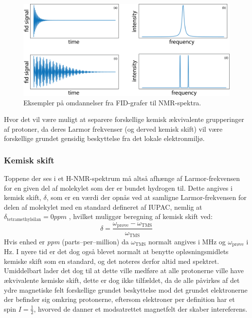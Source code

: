     \begin{figure}[H]
        \includegraphics[width=\textwidth]{billeder/fourier}
        \caption{Eksempler på omdannelser fra FID-grafer til NMR-spektra.}
    \end{figure}
    Hvor det vil være muligt at separere forskellige kemisk ækvivalente grupperinger af protoner, da deres Larmor frekvenser (og derved kemisk skift) vil være forskellige grundet gensidig beskyttelse fra det lokale elektronmiljø.

    \subsubsection{Kemisk skift}
    Toppene der ses i et H-NMR-spektrum må altså afhænge af Larmor-frekvensen for en given del af molekylet som der er bundet hydrogen til. Dette angives i kemisk skift, $\delta$, som er en værdi der opnås ved at samligne Larmor-frekvensen for delen af molekylet med en standard defineret af IUPAC, nemlig at $\delta_{\text{tetramethylsilan}}=0\si{ppm}$ \parencite{Robi2009}, hvilket muliggør beregning af kemisk skift ved:
    \[
        \delta = \frac{\omega_{\text{prøve}}-\omega_{\text{TMS}}}{\omega_{\text{TMS}}}
    \]
    Hvis enhed er \textit{ppm} (parts--per--million) da $\omega_{\text{TMS}}$ normalt angives i MHz og  $\omega_{\text{prøve}}$ i Hz. I nyere tid er det dog også blevet normalt at benytte opløsningsmidlets kemiske skift som en standard, og det noteres derfor altid med spektret. Umiddelbart lader det dog til at dette ville medføre at alle protonerne ville have ækvivalente kemiske skift, dette er dog ikke tilfældet, da de alle påvirkes af det ydre magnetiske felt forskellige grundet beskyttelse mod det grundet elektronerne der befinder sig omkring protonerne, eftersom elektroner per definition har et spin $I=\frac{1}{2}$, hvorved de danner et modsatrettet magnetfelt der skaber intereferens.

